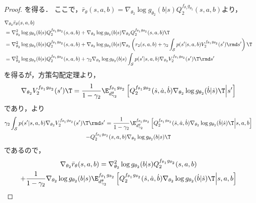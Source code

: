 \documentclass[a4paper,10pt,dvipdfmx]{jsarticle}
\begin{document}
\begin{proof}
    を得る．
    ここで，$\bar{r}_\theta(s,a,b)=\nabla_{\theta_2}\log g_{\theta_2}(b|s)Q_2^{f_{\theta_1}g_{\theta_2}}(s,a,b)$より，
    \begin{subequations}
    \begin{align}
        &\nabla_{\theta_2}\bar{r}_{\theta}(s,a,b)\nonumber\\
        &=\nabla_{\theta_2}^2\log g_{\theta_2}(b|s)Q_2^{f_{\theta_1}g_{\theta_2}}(s,a,b)+\nabla_{\theta_2}\log g_{\theta_2}(b|s)\nabla_{\theta_2}Q_2^{f_{\theta_1}g_{\theta_2}}(s,a,b)\T\\
        &=\nabla_{\theta_2}^2\log g_{\theta_2}(b|s)Q_2^{f_{\theta_1}g_{\theta_2}}(s,a,b)+\nabla_{\theta_2}\log g_{\theta_2}(b|s)\nabla_{\theta_2}\left(r_2(s,a,b) + \gamma_2\int_{\mathcal{S}}p(s'|s,a,b)V_2^{f_{\theta_1}g_{\theta_2}}(s')\rmd s'\right)\T\\
        &=\nabla_{\theta_2}^2\log g_{\theta_2}(b|s)Q_2^{f_{\theta_1}g_{\theta_2}}(s,a,b)+\gamma_2\nabla_{\theta_2}\log g_{\theta_2}(b|s) \int_{\mathcal{S}}p(s'|s,a,b)\nabla_{\theta_2}V_2^{f_{\theta_1}g_{\theta_2}}(s')\T \rmd s'
    \end{align}
    \end{subequations}
    を得るが，方策勾配定理より，
    \begin{align}
        \nabla_{\theta_2}V_2^{f_{\theta_1}g_{\theta_2}}(s')\T=\dfrac{1}{1-\gamma_2}\E_{d_{\gamma_2}^{\theta}}^{f_{\theta_1}g_{\theta_2}}\left[Q_2^{f_{\theta_1}g_{\theta_2}}(\dot{s},\dot{a},\dot{b})\nabla_{\theta_2}\log g_{\theta_2}(\dot{b}|\dot{s})\T\middle|s'\right]
    \end{align}
    であり，より
    \begin{multline}
        \gamma_2\int_{\mathcal{S}}p(s'|s,a,b)\nabla_{\theta_2}V_2^{f_{\theta_1}g_{\theta_2}}(s')\T \rmd s'=\dfrac{1}{1-\gamma_2}\E_{d_{\gamma_2}^{\theta}}^{f_{\theta_1}g_{\theta_2}}\left[Q_2^{f_{\theta_1}g_{\theta_2}}(\dot{s},\dot{a},\dot{b})\nabla_{\theta_2}\log g_{\theta_2}(\dot{b}|\dot{s})\T\middle|s,a,b\right]\\
        -Q_2^{f_{\theta_1}g_{\theta_2}}(s,a,b)\nabla_{\theta_2}\log g_{\theta_2}(b|s)\T
    \end{multline}
    であるので，
    \begin{multline}
        \nabla_{\theta_2}\bar{r}_{\theta}(s,a,b)
        =\nabla_{\theta_2}^2\log g_{\theta_2}(b|s)Q_2^{f_{\theta_1}g_{\theta_2}}(s,a,b)\\
        +\dfrac{1}{1-\gamma_2}\nabla_{\theta_2}\log g_{\theta_2}(b|s)\E_{d_{\gamma_2}^{\theta}}^{f_{\theta_1}g_{\theta_2}}\left[Q_2^{f_{\theta_1}g_{\theta_2}}(\dot{s},\dot{a},\dot{b})\nabla_{\theta_2}\log g_{\theta_2}(\dot{b}|\dot{s})\T\middle|s,a,b\right]\\

\end{multline}
\end{proof}
\end{document}
